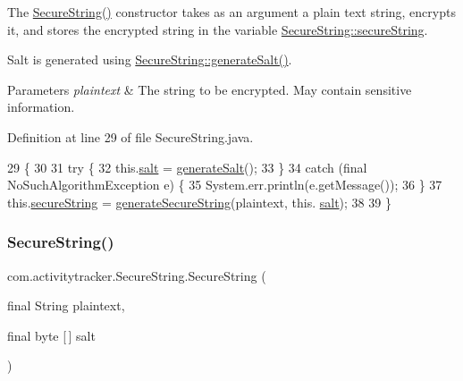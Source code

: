 The \mbox{\hyperlink{classcom_1_1activitytracker_1_1_secure_string_a889fcbf0c1f771962ac81886f49e389e}{Secure\+String()}} constructor takes as an argument a plain text string, encrypts it, and stores the encrypted string in the variable \mbox{\hyperlink{classcom_1_1activitytracker_1_1_secure_string_a1448f7b8865c6c57cc7218662ee7f1ee}{Secure\+String\+::secure\+String}}.

Salt is generated using \mbox{\hyperlink{classcom_1_1activitytracker_1_1_secure_string_a1907ad109bb5e64291fabd3ff459ef49}{Secure\+String\+::generate\+Salt()}}.


\begin{DoxyParams}{Parameters}
{\em plaintext} & The string to be encrypted. May contain sensitive information. \\
\hline
\end{DoxyParams}


Definition at line 29 of file Secure\+String.\+java.


\begin{DoxyCode}
29                                          \{
30 
31         \textcolor{keywordflow}{try} \{
32             this.\mbox{\hyperlink{classcom_1_1activitytracker_1_1_secure_string_a8549ead1f186ff0c2520818b03d1cc21}{salt}} = \mbox{\hyperlink{classcom_1_1activitytracker_1_1_secure_string_a1907ad109bb5e64291fabd3ff459ef49}{generateSalt}}();
33         \}
34         \textcolor{keywordflow}{catch} (\textcolor{keyword}{final} NoSuchAlgorithmException e) \{
35             System.err.println(e.getMessage());
36         \}
37         this.\mbox{\hyperlink{classcom_1_1activitytracker_1_1_secure_string_a1448f7b8865c6c57cc7218662ee7f1ee}{secureString}} = \mbox{\hyperlink{classcom_1_1activitytracker_1_1_secure_string_aa2521591ab15fb4c5a2461c04b08320f}{generateSecureString}}(plaintext, this.
      \mbox{\hyperlink{classcom_1_1activitytracker_1_1_secure_string_a8549ead1f186ff0c2520818b03d1cc21}{salt}});
38 
39     \}
\end{DoxyCode}
\mbox{\label{classcom_1_1activitytracker_1_1_secure_string_a04c2f0677ecd9af147428976a11c85e2}} 
\subsubsection{\texorpdfstring{Secure\+String()}{SecureString()}\hspace{0.1cm}{\footnotesize\ttfamily [2/2]}}
{\footnotesize\ttfamily com.\+activitytracker.\+Secure\+String.\+Secure\+String (\begin{DoxyParamCaption}\item[{final String}]{plaintext,  }\item[{final byte \mbox{[}$\,$\mbox{]}}]{salt }\end{DoxyParamCaption})\hspace{0.3cm}{\ttfamily [package]}}

